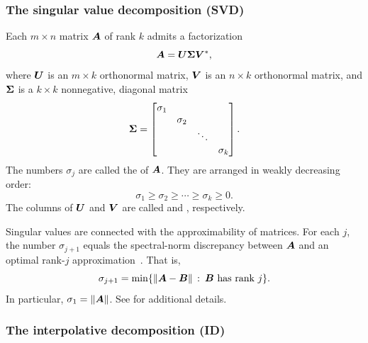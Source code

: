 \documentclass[final]{siamltex}
\begin{document}
\subsubsection{The singular value decomposition (SVD)}
\label{sec:SVD}
Each $m \times n$ matrix $\bm{A}$ of rank $k$ admits a factorization
$$
\bm{A} = \bm{U}\bm{\Sigma}\bm{V}^*,
$$
where $\bm{U}$ is an $m\times k$ orthonormal matrix, $\bm{V}$ is an
$n\times k$ orthonormal matrix, and $\bm{\Sigma}$ is a $k\times k$ nonnegative,
diagonal matrix
$$
\bm{\Sigma} = \begin{bmatrix}
\sigma_{1} &  &  &  \\
 & \sigma_{2} &  &  \\
 &  & \ddots  &  \\
 &  &  & \sigma_{k}
\end{bmatrix}.
$$
The numbers $\sigma_{j}$ are called the 
of $\bm{A}$.  They are arranged in weakly decreasing order:
$$
\sigma_{1} \geq \sigma_{2} \geq \cdots \geq \sigma_{k} \geq 0.
$$
The columns of $\bm{U}$ and $\bm{V}$ are called  and , respectively.

Singular values are connected with the approximability of
matrices.  For each $j$, the number $\sigma_{j+1}$ equals
the spectral-norm discrepancy between $\bm{A}$ and an optimal rank-$j$
approximation~\cite{Mir60:Symmetric-Gauge}.  That is,
\begin{equation}
\label{eq:svd_property}
\sigma_{j+1} = \min\{\norm{\mtx{A} - \mtx{B}}\,\colon\,\mtx{B}\mbox{ has rank }j\}.
\end{equation}
In particular, $\sigma_{1} = \left\Vert {\bm{A}} \right\Vert$.
See \cite[\S 2.5.3 and \S5.4.5]{golub} for additional details.

\subsubsection{The interpolative decomposition (ID)}
\label{sec:ID}

\end{document}
